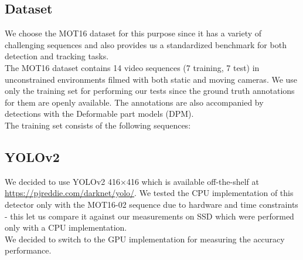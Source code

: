 \documentclass[10pt,twocolumn,letterpaper]{article}
\begin{document}
\subsection{Dataset}
We choose the MOT16\cite{MOT16} dataset for this purpose since it has a variety of challenging sequences and also provides us a standardized benchmark for both detection and tracking tasks.\\
The MOT16 dataset contains 14 video sequences (7 training, 7 test) in unconstrained environments filmed with both static and moving cameras. We use only the training set for performing our tests since the ground truth annotations for them are openly available. The annotations are also accompanied by detections with the Deformable part models (DPM)\cite{felzenszwalb2010object}.\\
The training set consists of the following sequences:
\begin{center}
\end{center}

\subsection{YOLOv2 }
We decided to use YOLOv2 416×416 which is available off-the-shelf at \url{https://pjreddie.com/darknet/yolo/}. We tested the CPU implementation of this detector only with the MOT16-02 sequence due to hardware and time constraints - this let us compare it against our measurements on SSD which were performed only with a CPU implementation. \\
We decided to switch to the GPU implementation for measuring the accuracy performance.
\end{document}
